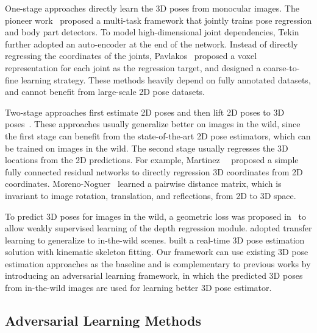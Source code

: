 \documentclass[10pt,twocolumn,letterpaper]{article}
\begin{document}
One-stage approaches directly learn the 3D poses from monocular images. 
The pioneer work~\cite{li20143d} proposed a multi-task framework that jointly trains pose regression and body part detectors. 
To model high-dimensional joint dependencies, Tekin \etal~\cite{tekin2016structured} further adopted an auto-encoder at the end of the network. 
Instead of directly regressing the coordinates of the joints, Pavlakos\etal~\cite{pavlakos2016coarse} proposed a voxel representation for each joint as the regression target, and designed a coarse-to-fine learning strategy. 
These methods heavily depend on fully annotated datasets, and cannot benefit from large-scale 2D pose datasets. 


Two-stage approaches first estimate 2D poses and then lift 2D poses to 3D poses~\cite{zhou2016sparseness,chen20163d,bogo2016keep,wu2016single,moreno20163d,tome2017lifting,martinez2017simple,zhou2017towards,nie2017monocular}. 
These approaches usually generalize better on images in the wild, since the first stage can benefit from the state-of-the-art 2D pose estimators, which can be trained on images in the wild. 
The second stage usually regresses the 3D locations from the 2D predictions. 
For example, Martinez~\etal~\cite{martinez2017simple} proposed a simple fully connected residual networks to directly regression 3D coordinates from 2D coordinates. 
Moreno-Noguer~\cite{moreno20163d} learned a pairwise distance matrix, which is invariant to image rotation, translation, and reflections, from 2D to 3D space. 

To predict 3D poses for images in the wild, a geometric loss was proposed in~\cite{zhou2017towards} to allow weakly supervised learning of the depth regression module. \cite{mehta2017monocular} adopted transfer
learning to generalize to in-the-wild scenes. 
\cite{mehta2017vnect} built a real-time 3D pose estimation solution with kinematic skeleton fitting. 
Our framework can use existing 3D pose estimation approaches as the baseline and is complementary to previous works by introducing an adversarial learning framework, in which the predicted 3D poses from in-the-wild images are used for learning better 3D pose estimator.

\subsection{Adversarial Learning Methods }
\end{document}
